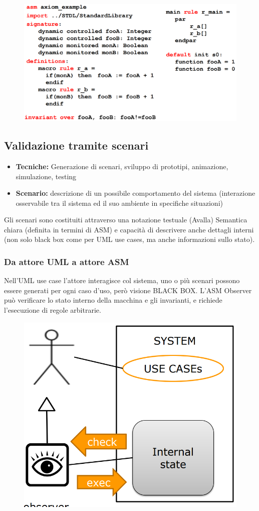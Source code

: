 \documentclass{report}
\begin{document}
\begin{figure}[H]
    \includegraphics[width=0.8\linewidth]{chapters/1-asm/images/axiomex.png}
\end{figure}


\subsection{Validazione tramite scenari}
\begin{itemize}
    \item \textbf{Tecniche:} Generazione di scenari, sviluppo di prototipi, animazione, simulazione, testing 
    \item \textbf{Scenario:} descrizione di un possibile comportamento del sistema (interazione osservabile tra il sistema ed il suo
    ambiente in specifiche situazioni)
\end{itemize}

\noindent Gli scenari sono costituiti attraverso una notazione testuale (Avalla)
Semantica chiara (definita in termini di ASM) e capacità di descrivere anche dettagli interni (non solo black box come per UML use cases, ma
anche informazioni sullo stato).

\subsubsection{Da attore UML  a attore ASM}
\noindent Nell'UML use case l'attore interagisce col sistema, uno o più scenari possono essere generati per
ogni caso d'uso, però visione BLACK BOX.
\noindent L'ASM Observer può verificare lo stato interno della macchina e gli invarianti, e
richiede l'esecuzione di regole arbitrarie.

\begin{figure}[H]
    \includegraphics[width=0.5\linewidth]{chapters/1-asm/images/attoreASM.png}
\end{figure}
\end{document}

